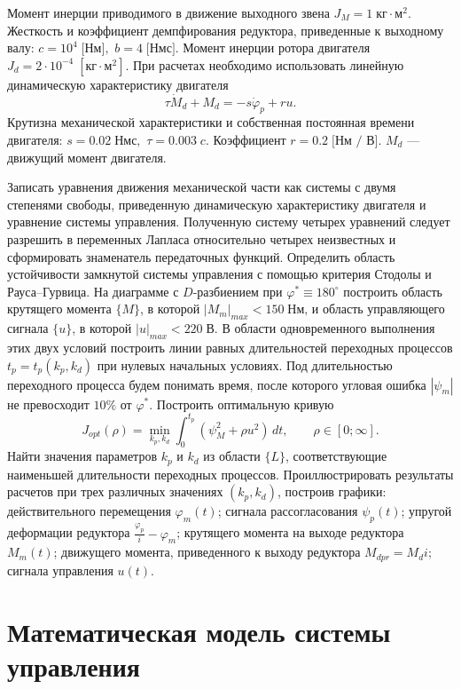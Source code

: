 \documentclass[a4paper, 14pt]{extarticle}
\begin{document}
        Момент инерции приводимого в движение выходного звена $J_M = 1 \; \text{кг}\cdot\text{м}^2 .$ Жесткость и коэффициент демпфирования редуктора, приведенные к выходному валу: $c = 10^4 \; \text{[Нм]}, \,\, b = 4 \; \text{[Нмс]}.$ Момент инерции ротора двигателя $J_d = 2 \cdot 10^{-4} \; [\text{кг}\cdot\text{м}^2].$ При расчетах необходимо использовать линейную динамическую характеристику двигателя
        \[
        \tau \dot{M}_d + M_d = -s\dot{\varphi}_p + ru.
        \]
        Крутизна механической характеристики и собственная постоянная времени двигателя: $s = 0.02 \; \text{Нмс}, \, \, \tau = 0.003 \; c.$ Коэффициент $r = 0.2 \; \text{[Нм / В]}.$ $M_d$ — движущий момент двигателя.
        
        Записать уравнения движения механической части как системы с двумя степенями свободы, приведенную динамическую характеристику двигателя и уравнение системы управления. Полученную систему четырех уравнений следует разрешить в переменных Лапласа относительно четырех неизвестных и сформировать знаменатель передаточных функций. Определить область устойчивости замкнутой системы управления с помощью критерия Стодолы и Рауса–Гурвица. На диаграмме с $D$-разбиением при $\varphi^* \equiv 180^\circ$ построить область крутящего момента $\{M\}$, в которой $|M_m|_{max} < 150 \; \text{Нм,}$ и область управляющего сигнала $\{u\}$, в которой $|u|_{max} < 220 \; В.$ В области одновременного выполнения этих двух условий построить линии равных длительностей переходных процессов $t_p = t_p(k_p,k_d)$ при нулевых начальных условиях. Под длительностью переходного процесса будем понимать время, после которого угловая ошибка $|\psi_m|$ не превосходит $10\%$ от $\varphi^*$. Построить оптимальную кривую
        \[
        J_{opt}(\rho)=
        \min_{k_p,k_d}
        \int_{0}^{t_p}(\psi^2_M+\rho u^2)\,dt,
        \qquad
        \rho \in [0;\infty].
        \]
        Найти значения параметров $k_p$ и $k_d$ из области $\{L\}$, соответствующие наименьшей длительности переходных процессов. Проиллюстрировать результаты расчетов при трех различных значениях $(k_p,k_d)$, построив графики: действительного перемещения $\varphi_m(t)$; сигнала рассогласования $\psi_p(t)$; упругой деформации редуктора $\frac{\varphi_p}{i}-\varphi_m$; крутящего момента на выходе редуктора $M_m(t)$; движущего момента, приведенного к выходу редуктора
        $M_{dpr}=M_d i;$ сигнала управления $u(t)$.

    \newpage
    \section{Математическая модель системы управления}
\end{document}
